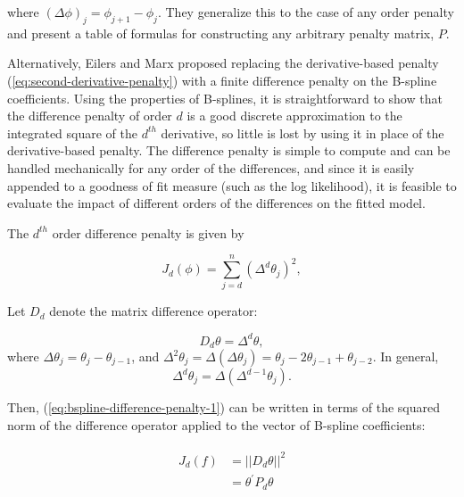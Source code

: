 \noindent
where $\left(\Delta \phi \right)_j = \phi_{j+1}-\phi_j$. They generalize this to the case of any order penalty and present a table of formulas for constructing any arbitrary penalty matrix, $P$.  

\bigskip

Alternatively, Eilers and Marx proposed replacing the derivative-based penalty (\ref{eq:second-derivative-penalty}) with a finite difference penalty on the B-spline coefficients. Using the properties of B-splines, it is straightforward to show that the difference penalty of order $d$ is a good discrete approximation to the integrated square of the $d^{th}$ derivative, so little is lost by using it in place of the derivative-based penalty. The difference penalty is simple to compute and can be handled mechanically for any order of the differences, and since it is easily appended to a goodness of fit measure (such as the log likelihood), it is feasible to evaluate the impact of different orders of the differences on the fitted model.  

\bigskip

The $d^{th}$ order difference penalty is given by 

\begin{equation} \label{eq:bspline-difference-penalty-1}
J_d\left( \phi \right) = \sum_{j=d}^n \left(\Delta^d \theta_j\right)^2,
\end{equation} 

\noindent
Let $D_d$ denote the matrix difference operator:

\[
D_d\theta = \Delta^d \theta,
\]
\noindent
where $\Delta \theta_j = \theta_j - \theta_{j-1}$, and $\Delta^2 \theta_j = \Delta\left(\Delta \theta_j\right) = \theta_j - 2\theta_{j-1} + \theta_{j-2}$. In general,
\begin{equation*}
\Delta^d \theta_j = \Delta\left(\Delta^{d-1} \theta_j \right).
\end{equation*} 

\noindent
Then, (\ref{eq:bspline-difference-penalty-1}) can be written in terms of the squared norm of the difference operator applied to the vector of B-spline coefficients:

\begin{align} 
\begin{split} \label{eq:bspline-difference-penalty-2}
J_d\left( f \right) &= \vert \vert D_d\theta \vert \vert^2 \\
&= \theta^\prime P_d \theta
\end{split}
\end{align}

